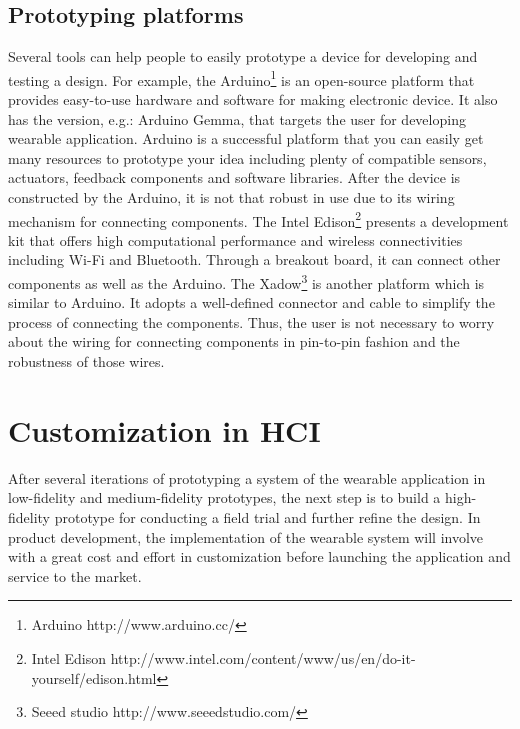 \subsection{Prototyping platforms}
Several tools can help people to easily prototype a device for developing and testing a design. For example, the Arduino\footnote{Arduino
\hspace{1cm} http://www.arduino.cc/} is an open-source platform that provides easy-to-use hardware and software for making electronic device. It also has the version, e.g.: Arduino Gemma, that targets the user for developing wearable application. Arduino is a successful platform that you can easily get many resources to prototype your idea including plenty of compatible sensors, actuators, feedback components and software libraries.
After the device is constructed by the Arduino, it is not that robust in use due to its wiring mechanism for connecting components.
The Intel Edison\footnote{Intel Edison
\hspace{1cm} http://www.intel.com/content/www/us/en/do-it-yourself/edison.html} presents a development kit that offers high computational performance and wireless connectivities including Wi-Fi and Bluetooth. Through a breakout board, it can connect other components as well as the Arduino.
The Xadow\footnote{Seeed studio
\hspace{1cm} http://www.seeedstudio.com/} is another platform which is similar to Arduino. It adopts a well-defined connector and cable to simplify the process of connecting the components. Thus, the user is not necessary to worry about the wiring for connecting components in pin-to-pin fashion and the robustness of those wires.


\section{Customization in HCI}
After several iterations of prototyping a system of the wearable application in low-fidelity and medium-fidelity prototypes, the next step is to build a high-fidelity prototype for conducting a field trial and further refine the design.
In product development, the implementation of the wearable system will involve with a great cost and effort in customization before launching the application and service to the market.

